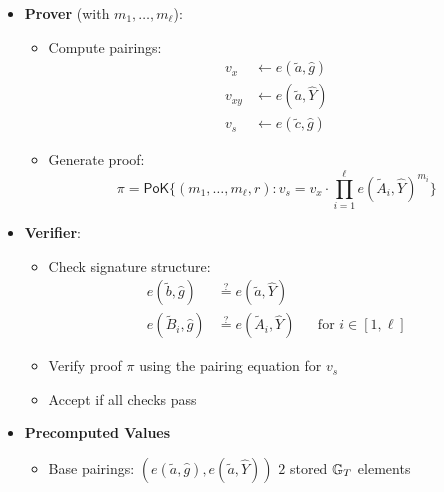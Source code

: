 {\begin{itemize}
\begin{itemize}
\begin{itemize}
        \item \textbf{Prover} (with $m_1, \ldots, m_\ell$):
            \begin{itemize}
                \item Compute pairings:
                    \begin{align*}
                        v_x &\gets e(\tilde{a}, \hat{g}) \\
                        v_{xy} &\gets e(\tilde{a}, \widehat{Y}) \\
                        v_s &\gets e(\tilde{c}, \hat{g})
                    \end{align*}
                \item Generate proof:
                    \[
                    \pi = \mathsf{PoK}\{(m_1, \ldots, m_\ell, r): v_s = v_x \cdot \prod_{i=1}^\ell e(\tilde{A}_i, \widehat{Y})^{m_i}\}
                    \]
            \end{itemize}
        
        \item \textbf{Verifier}:
            \begin{itemize}
                \item Check signature structure:
                    \begin{align*}
                        e(\tilde{b}, \hat{g}) &\stackrel{?}{=} e(\tilde{a}, \widehat{Y}) \\
                        e(\tilde{B}_i, \hat{g}) &\stackrel{?}{=} e(\tilde{A}_i, \widehat{Y}) && \text{for } i \in [1,\ell]
                    \end{align*}
                \item Verify proof $\pi$ using the pairing equation for $v_s$
                \item Accept if all checks pass
            \end{itemize}
    \end{itemize}
\end{itemize}
\end{itemize}


\newpage
\begin{itemize}
    \item \textbf{Precomputed Values}
    \begin{itemize}
        \item Base pairings: $(e(\tilde{a}, \hat{g}), e(\tilde{a}, \widehat{Y}))$ \qquad $2$ stored $\mathbb{G}_T$ elements
    \end{itemize}


\end{itemize}}
